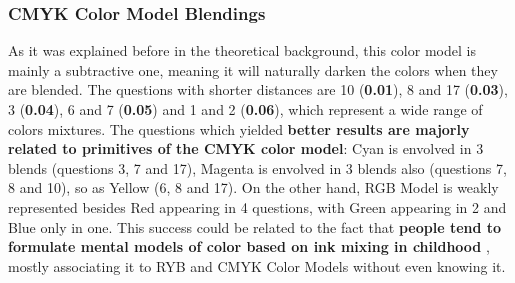 \subsubsection{CMYK Color Model Blendings}
\label{subsubsec:cmykcolormodel}
%
As it was explained before in the theoretical background, this color model is mainly a subtractive one, meaning it will naturally darken the colors when they are blended. The questions with shorter distances are 10 (\textbf{0.01}), 8 and 17 (\textbf{0.03}), 3 (\textbf{0.04}), 6 and 7 (\textbf{0.05})
and 1 and 2 (\textbf{0.06}), which represent a wide range of colors mixtures. The questions which yielded \textbf{better results are majorly related to primitives of the CMYK color model}: Cyan is envolved in 3 blends (questions 3, 7 and 17), Magenta is envolved in 3 blends also (questions 7, 8 and
10), so as Yellow (6, 8 and 17). On the other hand, RGB Model is weakly represented besides Red appearing in 4 questions, with Green appearing in 2 and Blue only in one. This success could be related to the fact that \textbf{people tend to formulate mental models of color based on ink mixing in childhood}
\cite{Gossett2004}, mostly associating it to \gls{RYB} and CMYK Color Models without even knowing it. \par
%
